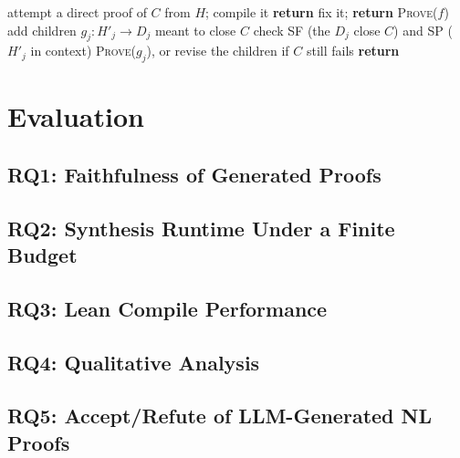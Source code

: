 \documentclass[letterpaper]{article} %
\begin{document}
\begin{algorithm}[t]
\caption{\textsc{Prove}(node $f\colon H \to C$), leaving every other node \texttt{sorry}. The whole proof is \textsc{Prove}($f_{\mathrm{main}}$).}
\label{alg:prove}
\begin{algorithmic}[1]
\STATE attempt a direct proof of $C$ from $H$; compile it \COMMENT{\llm}
  \STATE \textbf{return}
  \STATE fix it; \textbf{return} \textsc{Prove}($f$) \COMMENT{\llm}
\ENDIF
\REPEAT
  \STATE add children $g_j\colon H'_j \to D_j$ meant to close $C$ \COMMENT{\llm}
  \STATE check SF (the $D_j$ close $C$) and SP ($H'_j$ in context) \COMMENT{\script}
  \STATE \textsc{Prove}($g_j$), or revise the children if $C$ still fails \COMMENT{\llm}
\ENDFOR
\STATE \textbf{return}
\end{algorithmic}
\end{algorithm}

\section{Evaluation}

\subsection{RQ1: Faithfulness of Generated Proofs}

\subsection{RQ2: Synthesis Runtime Under a Finite Budget}

\subsection{RQ3: Lean Compile Performance}

\subsection{RQ4: Qualitative Analysis}

\subsection{RQ5: Accept/Refute of LLM-Generated NL Proofs}
\end{document}
